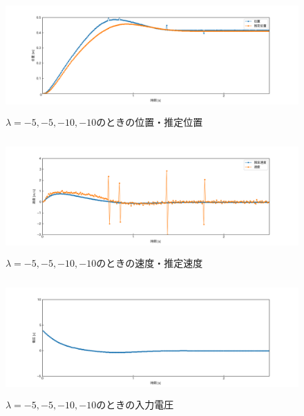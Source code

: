 \documentclass[12pt]{jsarticle}
\begin{document}
\begin{figure}[H]
  \begin{center}
    \includegraphics[clip,width=13.0cm, height=4.4cm]{../img/Exp10-1.png}
    \caption{$\lambda=-5, -5, -10, -10$のときの位置・推定位置}
    \label{Exp10-1}
  \end{center}
\end{figure}
\begin{figure}[H]
  \begin{center}
    \includegraphics[clip,width=13.0cm, height=4.4cm]{../img/Exp10-2.png}
    \caption{$\lambda=-5, -5, -10, -10$のときの速度・推定速度}
    \label{Exp10-2}
  \end{center}
\end{figure}
\begin{figure}[H]
  \begin{center}
    \includegraphics[clip,width=13.0cm, height=4.4cm]{../img/Exp10-3.png}
    \caption{$\lambda=-5, -5, -10, -10$のときの入力電圧}
    \label{Exp10-3}
  \end{center}
\end{figure}
\end{document}
